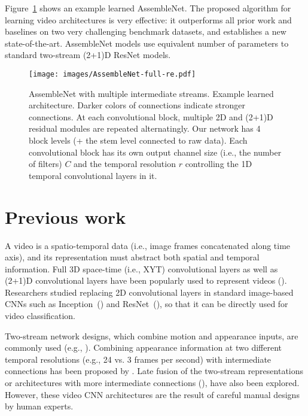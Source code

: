 \documentclass{article} \usepackage{iclr2020_conference,times}
\begin{document}
Figure~\ref{fig:assemblenet} shows an example learned AssembleNet.
The proposed algorithm for learning video architectures is very effective: it outperforms all prior work and baselines on two very challenging benchmark datasets, and establishes a new state-of-the-art. AssembleNet models use equivalent number of parameters to standard two-stream (2+1)D ResNet models.



\begin{figure}
  \centering
\texttt{[image: images/AssembleNet-full-re.pdf]}\caption{AssembleNet with multiple intermediate streams. Example learned architecture. Darker colors of connections indicate stronger connections. At each convolutional block, multiple 2D and (2+1)D residual modules are repeated alternatingly. Our network has 4 block levels (+ the stem level connected to raw data). Each convolutional block has its own output channel size (i.e., the number of filters) $C$ and the temporal resolution $r$ controlling the 1D temporal convolutional layers in it.
}
  \label{fig:assemblenet}
\end{figure}




\section{Previous work}


A video is a spatio-temporal data (i.e., image frames concatenated along time axis), and its representation must abstract both spatial and temporal information. Full 3D space-time (i.e., XYT) convolutional layers as well as (2+1)D convolutional layers have been popularly used to represent videos (\citealp{tran2014c3d,carreira2017quo,tran2018closer,xie2018rethinking}). Researchers studied replacing 2D convolutional layers in standard image-based CNNs such as Inception~(\citealp{szegedy2016rethinking}) and ResNet~(\citealp{he2016deep}), so that it can be directly used for video classification.



Two-stream network designs, which combine motion and appearance inputs, are commonly used (e.g., \citealp{simonyan2014two,feichtenhofer2016tsres,feichtenhofer2017tsmult,feichtenhofer2016convolutional}). Combining appearance information at two different temporal resolutions (e.g., 24 vs. 3 frames per second) with intermediate connections has been proposed by \cite{feichtenhofer2018slowfast}. Late fusion of the two-stream representations or architectures with more intermediate connections (\citealp{diba2019holistic}), have also been explored. However, these video CNN architectures are the result of careful manual designs by human experts.
\end{document}
